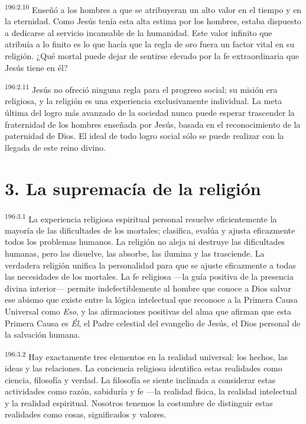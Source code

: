 \par 
\textsuperscript{196:2.10} Enseñó a los hombres a que se atribuyeran un alto valor en el tiempo y en la eternidad. Como Jesús tenía esta alta estima por los hombres, estaba dispuesto a dedicarse al servicio incansable de la humanidad. Este valor infinito que atribuía a lo finito es lo que hacía que la regla de oro fuera un factor vital en su religión. ¿Qué mortal puede dejar de sentirse elevado por la fe extraordinaria que Jesús tiene en él?

\par 
\textsuperscript{196:2.11} Jesús no ofreció ninguna regla para el progreso social; su misión era religiosa, y la religión es una experiencia exclusivamente individual. La meta última del logro más avanzado de la sociedad nunca puede esperar trascender la fraternidad de los hombres enseñada por Jesús, basada en el reconocimiento de la paternidad de Dios. El ideal de todo logro social sólo se puede realizar con la llegada de este reino divino.

\section*{3. La supremacía de la religión}
\par 
\textsuperscript{196:3.1} La experiencia religiosa espiritual personal resuelve eficientemente la mayoría de las dificultades de los mortales; clasifica, evalúa y ajusta eficazmente todos los problemas humanos. La religión no aleja ni destruye las dificultades humanas, pero las disuelve, las absorbe, las ilumina y las trasciende. La verdadera religión unifica la personalidad para que se ajuste eficazmente a todas las necesidades de los mortales. La fe religiosa ---la guía positiva de la presencia divina interior--- permite indefectiblemente al hombre que conoce a Dios salvar ese abismo que existe entre la lógica intelectual que reconoce a la Primera Causa Universal como \textit{Eso}, y las afirmaciones positivas del alma que afirman que esta Primera Causa es \textit{Él}, el Padre celestial del evangelio de Jesús, el Dios personal de la salvación humana.

\par 
\textsuperscript{196:3.2} Hay exactamente tres elementos en la realidad universal: los hechos, las ideas y las relaciones. La conciencia religiosa identifica estas realidades como ciencia, filosofía y verdad. La filosofía se siente inclinada a considerar estas actividades como razón, sabiduría y fe ---la realidad física, la realidad intelectual y la realidad espiritual. Nosotros tenemos la costumbre de distinguir estas realidades como cosas, significados y valores.

